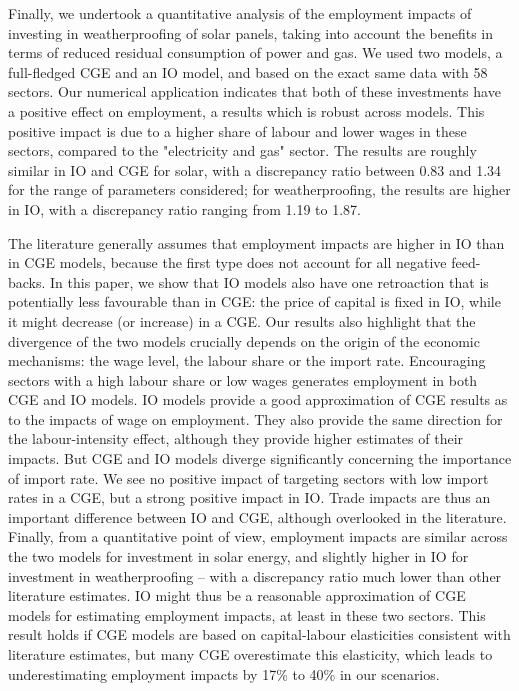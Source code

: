 Finally, we undertook a quantitative analysis of the employment impacts of investing in weatherproofing of solar panels, taking into account the benefits in terms of reduced residual consumption of power and gas. We used two models, a full-fledged CGE and an IO model, and based on the exact same data with 58 sectors.  
Our numerical application indicates that both of these investments have a positive effect on employment, a results which is robust across models. This positive impact is due to a higher share of labour and lower wages in these sectors, compared to the "electricity and gas" sector. The results are roughly similar in IO and CGE for solar, with a discrepancy ratio between 0.83 and 1.34 for the range of parameters considered; for weatherproofing, the results are higher in IO, with a discrepancy ratio ranging from 1.19 to 1.87.

The literature generally assumes that employment impacts are higher in IO than in CGE models, because the first type does not account for all negative feed-backs. In this paper, we show that IO models also have one retroaction that is potentially less favourable than in CGE: the price of capital is fixed in IO, while it might decrease (or increase) in a CGE.
Our results also highlight that the divergence of the two models crucially depends on the origin of the economic mechanisms: the wage level, the labour share or the import rate.
Encouraging sectors with a high labour share or low wages generates employment in both CGE and IO models. IO models provide a good approximation of CGE results as to the impacts of wage on employment. They also provide the same direction for the labour-intensity effect, although they provide higher estimates of their impacts. 
But CGE and IO models diverge significantly concerning the importance of import rate. We see no positive impact of targeting sectors with low import rates in a CGE, but a strong positive impact in IO. Trade impacts are thus an important difference between IO and CGE, although overlooked in the literature.
Finally, from a quantitative point of view, employment impacts are similar across the two models for investment in solar energy, and slightly higher in IO for investment in weatherproofing -- with a discrepancy ratio much lower than other literature estimates. IO might thus be a reasonable approximation of CGE models for estimating employment impacts, at least in these two sectors. This result holds if CGE models are based on capital-labour elasticities consistent with literature estimates, but many CGE overestimate this elasticity, which leads to underestimating employment impacts by 17\% to 40\% in our scenarios. 

